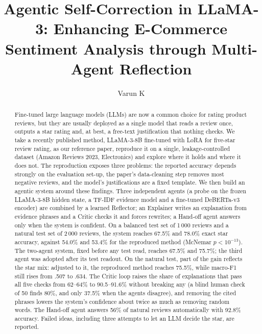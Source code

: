 \documentclass[runningheads]{llncs}
\begin{document}
\title{Agentic Self-Correction in LLaMA-3: Enhancing E-Commerce Sentiment Analysis through Multi-Agent Reflection}
\author{Varun K}

\maketitle

\begin{abstract}
Fine-tuned large language models (LLMs) are now a common choice for rating product reviews, but they are usually deployed as a single model that reads a review once, outputs a star rating and, at best, a free-text justification that nothing checks. We take a recently published method, LLaMA-3-8B fine-tuned with LoRA for five-star review rating, as our reference paper, reproduce it on a single, leakage-controlled dataset (Amazon Reviews 2023, Electronics) and explore where it holds and where it does not. The reproduction exposes three problems: the reported accuracy depends strongly on the evaluation set-up, the paper's data-cleaning step removes most negative reviews, and the model's justifications are a fixed template. We then build an agentic system around these findings. Three independent agents (a probe on the frozen LLaMA-3-8B hidden state, a TF-IDF evidence model and a fine-tuned DeBERTa-v3 encoder) are combined by a learned Reflector; an Explainer writes an explanation from evidence phrases and a Critic checks it and forces rewrites; a Hand-off agent answers only when the system is confident. On a balanced test set of 1\,000 reviews and a natural test set of 2\,000 reviews, the system reaches 67.5\% and 78.0\% exact star accuracy, against 54.0\% and 53.4\% for the reproduced method (McNemar $p<10^{-13}$). The two-agent system, fixed before any test read, reaches 67.5\% and 75.7\%; the third agent was adopted after its test readout. On the natural test, part of the gain reflects the star mix: adjusted to it, the reproduced method reaches 75.5\%, while macro-F1 still rises from .507 to .634. The Critic loop raises the share of explanations that pass all five checks from 62--64\% to 90.5--91.6\% without breaking any (a blind human check of 50 finds 80\%, and only 37.5\% when the agents disagree), and removing the cited phrases lowers the system's confidence about twice as much as removing random words. The Hand-off agent answers 56\% of natural reviews automatically with 92.8\% accuracy. Failed ideas, including three attempts to let an LLM decide the star, are reported.
\end{abstract}
\end{document}
